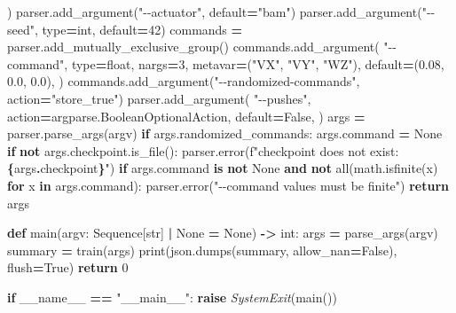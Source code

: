\documentclass[
  chinese,
  11pt,
  letterpaper,
]{article}
\newenvironment{Shaded}{\begin{snugshade}}{\end{snugshade}}
\newcommand{\BuiltInTok}[1]{#1}
\newcommand{\ControlFlowTok}[1]{\textcolor[rgb]{0.13,0.29,0.53}{\textbf{#1}}}
\newcommand{\DecValTok}[1]{\textcolor[rgb]{0.00,0.00,0.81}{#1}}
\newcommand{\FloatTok}[1]{\textcolor[rgb]{0.00,0.00,0.81}{#1}}
\newcommand{\KeywordTok}[1]{\textcolor[rgb]{0.13,0.29,0.53}{\textbf{#1}}}
\newcommand{\NormalTok}[1]{#1}
\newcommand{\OperatorTok}[1]{\textcolor[rgb]{0.81,0.36,0.00}{\textbf{#1}}}
\newcommand{\PreprocessorTok}[1]{\textcolor[rgb]{0.56,0.35,0.01}{\textit{#1}}}
\newcommand{\SpecialCharTok}[1]{\textcolor[rgb]{0.81,0.36,0.00}{\textbf{#1}}}
\newcommand{\SpecialStringTok}[1]{\textcolor[rgb]{0.31,0.60,0.02}{#1}}
\newcommand{\StringTok}[1]{\textcolor[rgb]{0.31,0.60,0.02}{#1}}
\newcommand{\VariableTok}[1]{\textcolor[rgb]{0.00,0.00,0.00}{#1}}
\renewenvironment{Shaded}{\par\smallskip}{\par\smallskip}
\begin{document}
\begin{Shaded}
\begin{Highlighting}[]
\NormalTok{    )}
\NormalTok{    parser.add\_argument(}\StringTok{"{-}{-}actuator"}\NormalTok{, default}\OperatorTok{=}\StringTok{"bam"}\NormalTok{)}
\NormalTok{    parser.add\_argument(}\StringTok{"{-}{-}seed"}\NormalTok{, }\BuiltInTok{type}\OperatorTok{=}\BuiltInTok{int}\NormalTok{, default}\OperatorTok{=}\DecValTok{42}\NormalTok{)}
\NormalTok{    commands }\OperatorTok{=}\NormalTok{ parser.add\_mutually\_exclusive\_group()}
\NormalTok{    commands.add\_argument(}
        \StringTok{"{-}{-}command"}\NormalTok{,}
        \BuiltInTok{type}\OperatorTok{=}\BuiltInTok{float}\NormalTok{,}
\NormalTok{        nargs}\OperatorTok{=}\DecValTok{3}\NormalTok{,}
\NormalTok{        metavar}\OperatorTok{=}\NormalTok{(}\StringTok{"VX"}\NormalTok{, }\StringTok{"VY"}\NormalTok{, }\StringTok{"WZ"}\NormalTok{),}
\NormalTok{        default}\OperatorTok{=}\NormalTok{(}\FloatTok{0.08}\NormalTok{, }\FloatTok{0.0}\NormalTok{, }\FloatTok{0.0}\NormalTok{),}
\NormalTok{    )}
\NormalTok{    commands.add\_argument(}\StringTok{"{-}{-}randomized{-}commands"}\NormalTok{, action}\OperatorTok{=}\StringTok{"store\_true"}\NormalTok{)}
\NormalTok{    parser.add\_argument(}
        \StringTok{"{-}{-}pushes"}\NormalTok{,}
\NormalTok{        action}\OperatorTok{=}\NormalTok{argparse.BooleanOptionalAction,}
\NormalTok{        default}\OperatorTok{=}\VariableTok{False}\NormalTok{,}
\NormalTok{    )}
\NormalTok{    args }\OperatorTok{=}\NormalTok{ parser.parse\_args(argv)}
    \ControlFlowTok{if}\NormalTok{ args.randomized\_commands:}
\NormalTok{        args.command }\OperatorTok{=} \VariableTok{None}
    \ControlFlowTok{if} \KeywordTok{not}\NormalTok{ args.checkpoint.is\_file():}
\NormalTok{        parser.error(}\SpecialStringTok{f"checkpoint does not exist: }\SpecialCharTok{\{}\NormalTok{args}\SpecialCharTok{.}\NormalTok{checkpoint}\SpecialCharTok{\}}\SpecialStringTok{"}\NormalTok{)}
    \ControlFlowTok{if}\NormalTok{ args.command }\KeywordTok{is} \KeywordTok{not} \VariableTok{None} \KeywordTok{and} \KeywordTok{not} \BuiltInTok{all}\NormalTok{(math.isfinite(x) }\ControlFlowTok{for}\NormalTok{ x }\KeywordTok{in}\NormalTok{ args.command):}
\NormalTok{        parser.error(}\StringTok{"{-}{-}command values must be finite"}\NormalTok{)}
    \ControlFlowTok{return}\NormalTok{ args}


\KeywordTok{def}\NormalTok{ main(argv: Sequence[}\BuiltInTok{str}\NormalTok{] }\OperatorTok{|} \VariableTok{None} \OperatorTok{=} \VariableTok{None}\NormalTok{) }\OperatorTok{{-}\textgreater{}} \BuiltInTok{int}\NormalTok{:}
\NormalTok{    args }\OperatorTok{=}\NormalTok{ parse\_args(argv)}
\NormalTok{    summary }\OperatorTok{=}\NormalTok{ train(args)}
    \BuiltInTok{print}\NormalTok{(json.dumps(summary, allow\_nan}\OperatorTok{=}\VariableTok{False}\NormalTok{), flush}\OperatorTok{=}\VariableTok{True}\NormalTok{)}
    \ControlFlowTok{return} \DecValTok{0}


\ControlFlowTok{if} \VariableTok{\_\_name\_\_} \OperatorTok{==} \StringTok{"\_\_main\_\_"}\NormalTok{:}
    \ControlFlowTok{raise} \PreprocessorTok{SystemExit}\NormalTok{(main())}
\end{Highlighting}
\end{Shaded}
\end{document}
